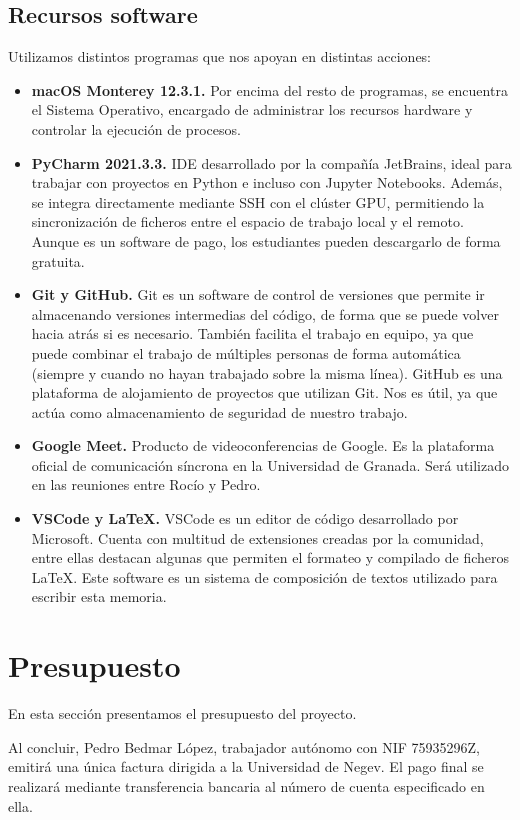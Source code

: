 \subsection{Recursos software}
\noindent Utilizamos distintos programas que nos apoyan en distintas acciones:
\begin{itemize}
    \item \textbf{macOS Monterey 12.3.1.} Por encima del resto de programas, se encuentra el Sistema Operativo, encargado de administrar los recursos hardware y controlar la ejecución de procesos.
    \item \textbf{PyCharm 2021.3.3.} IDE desarrollado por la compañía JetBrains, ideal para trabajar con proyectos en Python e incluso con Jupyter Notebooks. Además, se integra directamente mediante SSH con el clúster GPU, permitiendo la sincronización de ficheros entre el espacio de trabajo local y el remoto. Aunque es un software de pago, los estudiantes pueden descargarlo de forma gratuita.
    \item \textbf{Git y GitHub.} Git es un software de control de versiones que permite ir almacenando versiones intermedias del código, de forma que se puede volver hacia atrás si es necesario. También facilita el trabajo en equipo, ya que puede combinar el trabajo de múltiples personas de forma automática (siempre y cuando no hayan trabajado sobre la misma línea). GitHub es una plataforma de alojamiento de proyectos que utilizan Git. Nos es útil, ya que actúa como almacenamiento de seguridad de nuestro trabajo.
    \item \textbf{Google Meet.} Producto de videoconferencias de Google. Es la plataforma oficial de comunicación síncrona en la Universidad de Granada. Será utilizado en las reuniones entre Rocío y Pedro.
    \item \textbf{VSCode y \LaTeX.} VSCode es un editor de código desarrollado por Microsoft. Cuenta con multitud de extensiones creadas por la comunidad, entre ellas destacan algunas que permiten el formateo y compilado de ficheros \LaTeX. Este software es un sistema de composición de textos utilizado para escribir esta memoria.
\end{itemize}

\section{Presupuesto}
En esta sección presentamos el presupuesto del proyecto.

Al concluir, Pedro Bedmar López, trabajador autónomo con NIF 75935296Z, emitirá una única factura dirigida a la Universidad de Negev. El pago final se realizará mediante transferencia bancaria al número de cuenta especificado en ella.


